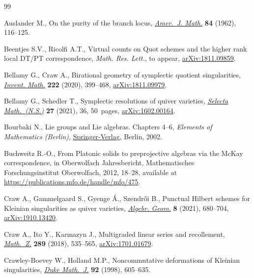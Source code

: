 \begin{thebibliography}{99}
\footnotesize\itemsep=0pt

Auslander M., On the purity of the branch locus, \href{https://doi.org/10.2307/2372807}{\textit{Amer.~J. Math.}}
 \textbf{84} (1962), 116--125.

Beentjes S.V., Ricolfi A.T., Virtual counts on {Q}uot schemes and the higher
 rank local {DT/PT} correspondence, \textit{Math. Res. Lett.}, {t}o appear,
 \href{https://arxiv.org/abs/1811.09859}{arXiv:1811.09859}.

Bellamy G., Craw A., Birational geometry of symplectic quotient singularities,
 \href{https://doi.org/10.1007/s00222-020-00972-9}{\textit{Invent. Math.}} \textbf{222} (2020), 399--468, \href{https://arxiv.org/abs/1811.09979}{arXiv:1811.09979}.

Bellamy G., Schedler T., Symplectic resolutions of quiver varieties,
 \href{https://doi.org/10.1007/s00029-021-00647-0}{\textit{Selecta Math.~(N.S.)}} \textbf{27} (2021), 36, 50~pages,
 \href{https://arxiv.org/abs/1602.00164}{arXiv:1602.00164}.

Bourbaki N., Lie groups and {L}ie algebras. {C}hapters 4--6, \textit{Elements of
 Mathematics (Berlin)}, \href{https://doi.org/10.1007/978-3-540-89394-3}{Springer-Verlag}, Berlin, 2002.

Buchweitz R.-O., From {P}latonic solids to preprojective algebras via the
 {M}c{K}ay correspondence, in Oberwolfach Jahresbericht, Mathematisches
 Forschungsinstitut Oberwolfach, 2012, 18--28, available at
 \url{https://publications.mfo.de/handle/mfo/475}.

Craw A., Gammelgaard S., Gyenge \'A., Szendr\H{o}i B., Punctual {H}ilbert schemes
 for {K}leinian singularities as quiver varieties, \href{https://doi.org/10.14231/AG-2021-021}{\textit{Algebr. Geom.}}
 \textbf{8} (2021), 680--704, \href{https://arxiv.org/abs/1910.13420}{arXiv:1910.13420}.

Craw A., Ito Y., Karmazyn J., Multigraded linear series and recollement,
 \href{https://doi.org/10.1007/s00209-017-1965-1}{\textit{Math.~Z.}} \textbf{289} (2018), 535--565, \href{https://arxiv.org/abs/1701.01679}{arXiv:1701.01679}.

Crawley-Boevey W., Holland M.P., Noncommutative deformations of {K}leinian
 singularities, \href{https://doi.org/10.1215/S0012-7094-98-09218-3}{\textit{Duke Math.~J.}} \textbf{92} (1998), 605--635.


\end{thebibliography}
